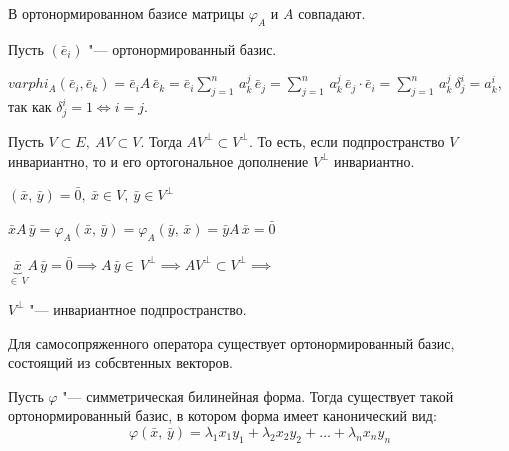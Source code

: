 \begin{theorem}
  В ортонормированном базисе матрицы $\varphi_A$ и $A$ совпадают.
\end{theorem}
\begin{Proof}
  Пусть $(\bar{e}_i)$ "--- ортонормированный базис.

  $varphi_A(\bar{e}_i, \bar{e}_k) = \bar{e}_i A\, \bar{e}_k = \bar{e}_i \sum\limits_{j = 1}^n \, a_k^j \, \bar{e}_j = \sum\limits_{j = 1}^n \, a_k^j \, \bar{e}_j \cdot \bar{e}_i = \sum\limits_{j = 1}^n \, a_k^j \, \delta_j^i = a_k^i$, так как $\delta_j^i = 1 \Leftrightarrow i = j$.
\end{Proof}

\begin{theorem}
  Пусть $V \subset E, ~ AV \subset V$. Тогда $AV^{\bot} \subset V^{\bot}$. То есть, если подпространство $V$ инвариантно, то и его ортогональное дополнение $V^{\bot}$ инвариантно.
\end{theorem}
\begin{Proof}
  $(\bar{x}, \, \bar{y}) = \bar{0},~ \bar{x} \in V, ~ \bar{y} \in V^{\bot}$

  $\bar{x} A\, \bar{y} = \varphi_A(\bar{x}, \, \bar{y}) = \varphi_A(\bar{y},\, \bar{x}) = \bar{y} A\, \bar{x} = \bar{0}$

  $\underbrace{\bar{x}}_{\in \, V} A\, \bar{y} = \bar{0} \implies A\, \bar{y} \in \, V^{\bot} \implies AV^{\bot} \subset V^{\bot} \implies$
  
  $V^{\bot}$ "--- инвариантное подпространство. 
\end{Proof}

\begin{theorem}
  Для самосопряженного оператора существует ортонормированный базис, состоящий из собсвтенных векторов.
\end{theorem}

\begin{theorem}
  Пусть $\varphi$ "--- симметрическая билинейная форма. Тогда существует такой ортонормированный базис, в котором форма имеет канонический вид:
  $$
    \varphi(\bar{x}, \, \bar{y}) = \lambda_1 x_1 y_1 + \lambda_2 x_2 y_2 + \ldots + \lambda_n x_n y_n
  $$
\end{theorem}